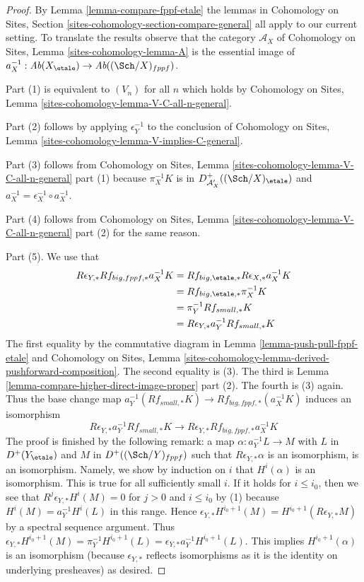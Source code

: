 \begin{proof}
By Lemma \ref{lemma-compare-fppf-etale} the lemmas in
Cohomology on Sites, Section \ref{sites-cohomology-section-compare-general}
all apply to our current setting. To translate the results
observe that the category $\mathcal{A}_X$ of
Cohomology on Sites, Lemma \ref{sites-cohomology-lemma-A}
is the essential image of
$a_X^{-1} : \textit{Ab}(X_\etale) \to \textit{Ab}((\Sch/X)_{fppf})$.

\medskip\noindent
Part (1) is equivalent to $(V_n)$ for all $n$ which holds by
Cohomology on Sites, Lemma \ref{sites-cohomology-lemma-V-C-all-n-general}.

\medskip\noindent
Part (2) follows by applying $\epsilon_Y^{-1}$ to the conclusion of
Cohomology on Sites, Lemma \ref{sites-cohomology-lemma-V-implies-C-general}.

\medskip\noindent
Part (3) follows from Cohomology on Sites, Lemma
\ref{sites-cohomology-lemma-V-C-all-n-general} part (1)
because $\pi_X^{-1}K$ is in $D^+_{\mathcal{A}'_X}((\Sch/X)_\etale)$
and $a_X^{-1} = \epsilon_X^{-1} \circ a_X^{-1}$.

\medskip\noindent
Part (4) follows from Cohomology on Sites, Lemma
\ref{sites-cohomology-lemma-V-C-all-n-general} part (2)
for the same reason.

\medskip\noindent
Part (5). We use that
\begin{align*}
R\epsilon_{Y, *}Rf_{big, fppf, *}a_X^{-1}K
& =
Rf_{big, \etale, *}R\epsilon_{X, *}a_X^{-1}K \\
& =
Rf_{big, \etale, *}\pi_X^{-1}K \\
& =
\pi_Y^{-1}Rf_{small, *}K \\
& =
R\epsilon_{Y, *} a_Y^{-1}Rf_{small, *}K
\end{align*}
The first equality by the commutative diagram in
Lemma \ref{lemma-push-pull-fppf-etale}
and Cohomology on Sites, Lemma
\ref{sites-cohomology-lemma-derived-pushforward-composition}.
The second equality is (3). The third is
Lemma \ref{lemma-compare-higher-direct-image-proper} part (2).
The fourth is (3) again. Thus the base change map
$a_Y^{-1}(Rf_{small, *}K) \to Rf_{big, fppf, *}(a_X^{-1}K)$
induces an isomorphism
$$
R\epsilon_{Y, *}a_Y^{-1}Rf_{small, *}K \to
R\epsilon_{Y, *}Rf_{big, fppf, *}a_X^{-1}K
$$
The proof is finished by the following remark: a map
$\alpha : a_Y^{-1}L \to M$ with $L$ in $D^+(Y_\etale)$
and $M$ in $D^+((\Sch/Y)_{fppf})$ such that $R\epsilon_{Y, *}\alpha$
is an isomorphism, is an isomorphism. Namely, 
we show by induction on $i$ that $H^i(\alpha)$ is an isomorphism.
This is true for all sufficiently small $i$.
If it holds for $i \leq i_0$, then we see that
$R^j\epsilon_{Y, *}H^i(M) = 0$ for $j > 0$ and $i \leq i_0$
by (1) because $H^i(M) = a_Y^{-1}H^i(L)$ in this range.
Hence $\epsilon_{Y, *}H^{i_0 + 1}(M) = H^{i_0 + 1}(R\epsilon_{Y, *}M)$
by a spectral sequence argument.
Thus $\epsilon_{Y, *}H^{i_0 + 1}(M) = \pi_Y^{-1}H^{i_0 + 1}(L) =
\epsilon_{Y, *}a_Y^{-1}H^{i_0 + 1}(L)$.
This implies $H^{i_0 + 1}(\alpha)$ is an isomorphism
(because $\epsilon_{Y, *}$ reflects isomorphisms as it is the
identity on underlying presheaves) as desired.
\end{proof}

